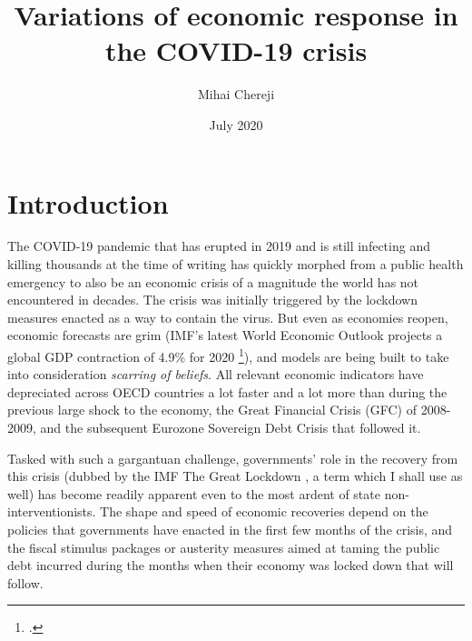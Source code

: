 \documentclass{article}
\title {Variations of economic response in the COVID-19 crisis}
\date {July 2020}
\author {Mihai Chereji
}
\begin{document}
\maketitle
\section{Introduction}
\label{Para:Intro}
    The COVID-19 pandemic that has erupted in 2019 and is still infecting and killing thousands at the time of writing has quickly morphed from a public health emergency to also be an economic crisis of a magnitude the world has not encountered in decades. The crisis was initially triggered by the lockdown measures enacted as a way to contain the virus. But even as economies reopen, economic forecasts are grim (IMF's latest World Economic Outlook projects a global GDP contraction of 4.9\% for 2020 \footcite[]{noauthor_world_2020}), and models are being built to take into consideration \emph{scarring of beliefs}\autocite{kozlowski_scarring_2020}. All relevant economic indicators  have depreciated across OECD countries a lot faster and a lot more than during the previous large shock to the economy, the Great Financial Crisis (GFC) of 2008-2009, and the subsequent Eurozone Sovereign Debt Crisis that followed it.

\label{Para:Consequences}
    Tasked with such a gargantuan challenge, governments' role in the recovery from this crisis (dubbed by the IMF The Great Lockdown \autocite{gopinath_great_2020}, a term which I shall use as well) has become readily apparent even to the most ardent of state non-interventionists. The shape and speed of economic recoveries depend on the policies that governments have enacted in the first few months of the crisis, and the fiscal stimulus packages or austerity measures aimed at taming the public debt incurred during the months when their economy was locked down that will follow.

\end{document}

